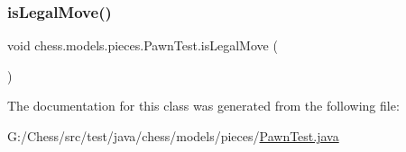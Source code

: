 \subsubsection{\texorpdfstring{is\+Legal\+Move()}{isLegalMove()}}
{\footnotesize\ttfamily void chess.\+models.\+pieces.\+Pawn\+Test.\+is\+Legal\+Move (\begin{DoxyParamCaption}{ }\end{DoxyParamCaption})}



The documentation for this class was generated from the following file\+:\begin{DoxyCompactItemize}
\item 
G\+:/\+Chess/src/test/java/chess/models/pieces/\mbox{\hyperlink{_pawn_test_8java}{Pawn\+Test.\+java}}\end{DoxyCompactItemize}
